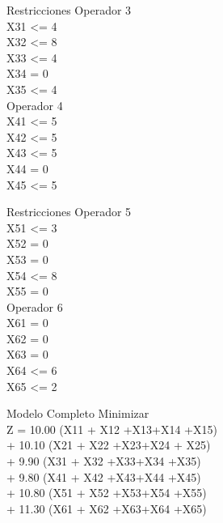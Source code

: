 \documentclass{beamer}
\begin{document}
\begin{frame}[fragile]{Restricciones}
Operador 3\\
    X31 <= 4 \\
    X32 <= 8\\
    X33 <= 4\\
    X34  = 0\\
    X35 <= 4\\


Operador 4\\
    X41 <= 5\\ 
    X42 <= 5\\
    X43 <= 5\\
    X44  = 0\\
    X45 <= 5\\
\end{frame}
\begin{frame}[fragile]{Restricciones}
Operador 5\\
    X51 <= 3\\ 
    X52 = 0\\
    X53 = 0\\
    X54  <=  8\\
    X55 = 0\\

Operador 6\\
    X61 = 0 \\
    X62 = 0\\
    X63 = 0\\
    X64  <=  6\\
    X65 <= 2\\

\end{frame}

\begin{frame}[fragile]{Modelo Completo}
Minimizar\\
    Z = 10.00 (X11 + X12 +X13+X14 +X15) \\
      + 10.10 (X21 + X22 +X23+X24 + X25)\\
      +  9.90 (X31 + X32 +X33+X34 +X35)\\
      + 9.80  (X41 + X42 +X43+X44 +X45)\\
      + 10.80  (X51 + X52 +X53+X54 +X55)\\
      + 11.30  (X61 + X62 +X63+X64 +X65)\\

\end{frame}
\end{document}
